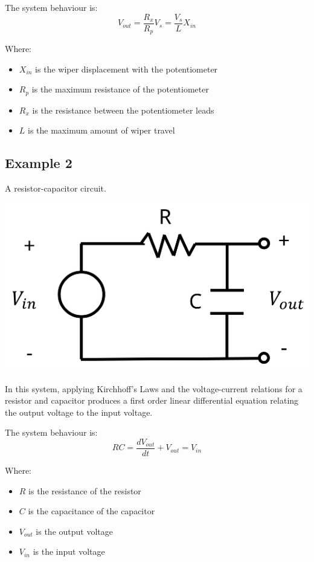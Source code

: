 \documentclass[11pt]{article}
\begin{document}
The system behaviour is:
\[V_{out} = \frac{R_x}{R_p} V_s = \frac{V_s}{L} X_{in}\]

Where:
\begin{itemize}
\item \(X_{in}\) is the wiper displacement with the potentiometer
\item \(R_p\) is the maximum resistance of the potentiometer
\item \(R_x\) is the resistance between the potentiometer leads
\item \(L\) is the maximum amount of wiper travel
\end{itemize}

 \newpage
\subsection{Example 2}
\label{sec:orge08e3fe}
A resistor-capacitor circuit.
\begin{center}
\includegraphics[width=.9\linewidth]{./images/resistor-capacitor-circuit.png}
\end{center}

In this system, applying Kirchhoff's Laws and the voltage-current relations for a resistor and capacitor produces a first order linear differential equation relating the output voltage to the input voltage.

The system behaviour is:
\[RC = \frac{dV_{out}}{dt} + V_{out} = V_{in}\]

Where:
\begin{itemize}
\item \(R\) is the resistance of the resistor
\item \(C\) is the capacitance of the capacitor
\item \(V_{out}\) is the output voltage
\item \(V_{in}\) is the input voltage
\end{itemize}
\end{document}
